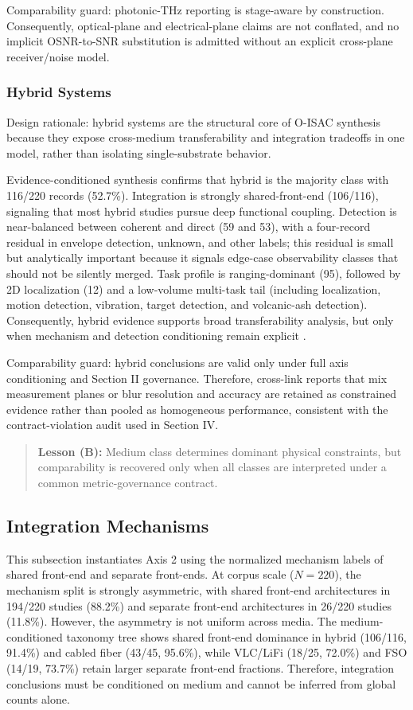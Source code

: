 \documentclass[lettersize,journal]{IEEEtran}
\begin{document}
Comparability guard: photonic-THz reporting is stage-aware by construction. Consequently, optical-plane and electrical-plane claims are not conflated, and no implicit OSNR-to-SNR substitution is admitted without an explicit cross-plane receiver/noise model.

\subsubsection{Hybrid Systems}
Design rationale: hybrid systems are the structural core of O-ISAC synthesis because they expose cross-medium transferability and integration tradeoffs in one model, rather than isolating single-substrate behavior.

Evidence-conditioned synthesis confirms that hybrid is the majority class with 116/220 records (52.7\%). Integration is strongly shared-front-end (106/116), signaling that most hybrid studies pursue deep functional coupling. Detection is near-balanced between coherent and direct (59 and 53), with a four-record residual in envelope detection, unknown, and other labels; this residual is small but analytically important because it signals edge-case observability classes that should not be silently merged. Task profile is ranging-dominant (95), followed by 2D localization (12) and a low-volume multi-task tail (including localization, motion detection, vibration, target detection, and volcanic-ash detection). Consequently, hybrid evidence supports broad transferability analysis, but only when mechanism and detection conditioning remain explicit \cite{O_ISAC_021,O_ISAC_077,O_ISAC_041,O_ISAC_199,O_ISAC_010}.

Comparability guard: hybrid conclusions are valid only under full axis conditioning and Section II governance. Therefore, cross-link reports that mix measurement planes or blur resolution and accuracy are retained as constrained evidence rather than pooled as homogeneous performance, consistent with the contract-violation audit used in Section IV.

\begin{quote}
\textbf{Lesson (B):} Medium class determines dominant physical constraints, but comparability is recovered only when all classes are interpreted under a common metric-governance contract.
\end{quote}

\subsection{Integration Mechanisms}
This subsection instantiates Axis 2 using the normalized mechanism labels of shared front-end and separate front-ends. At corpus scale ($N=220$), the mechanism split is strongly asymmetric, with shared front-end architectures in 194/220 studies (88.2\%) and separate front-end architectures in 26/220 studies (11.8\%). However, the asymmetry is not uniform across media. The medium-conditioned taxonomy tree shows shared front-end dominance in hybrid (106/116, 91.4\%) and cabled fiber (43/45, 95.6\%), while VLC/LiFi (18/25, 72.0\%) and FSO (14/19, 73.7\%) retain larger separate front-end fractions. Therefore, integration conclusions must be conditioned on medium and cannot be inferred from global counts alone.
\end{document}
